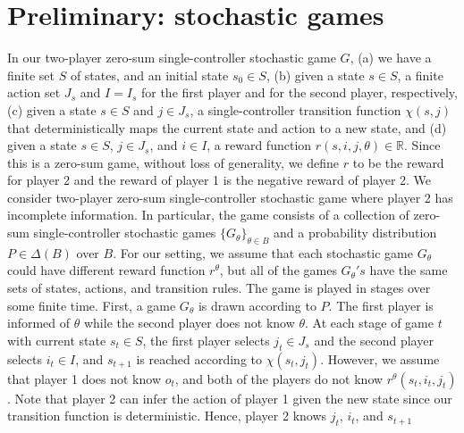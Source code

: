 \section{Preliminary: stochastic games} \label{stochastic_games}
In our two-player zero-sum single-controller stochastic game $G$, 
(a) we have a finite set $S$ of states, 
and an initial state $s_0 \in S$, 
(b) given a state $s \in S$, a finite action set $J_{s}$ and $I=I_s$ 
for the first player and for the second player, respectively, 
(c) given a state $s \in S$ and $j \in J_s$, a single-controller transition function
$\chi(s, j)$ that deterministically maps the current state and action to a new state, 
and (d) given a state $s \in S$, $j \in J_s$, and $i \in I$, 
a reward function $r(s,i,j,\theta) \in \mathbb{R}$. 
Since this is a zero-sum game, without loss of generality, 
we define $r$ to be the reward for player 2 and 
the reward of player 1 is the negative reward of player 2. 
We consider two-player zero-sum single-controller stochastic game 
where player 2 has incomplete information. 
In particular, the game consists of a collection of zero-sum 
single-controller stochastic games $\{G_\theta\}_{\theta \in B}$ 
and a probability distribution $P \in \Delta(B)$ over $B$. 
For our setting, we assume that each stochastic game 
$G_\theta$ could have different reward function $r^\theta$, but 
all of the games $G_\theta's$ have the same sets of states, actions, and transition rules. 
The game is played in stages over some finite time. 
First, a game $G_\theta$ is drawn according to $P$. 
The first player is informed of $\theta$
while the second player does not know $\theta$. 
At each stage of game $t$ with current state $s_t \in S$, 
the first player selects $j_t \in J_s$ 
and the second player selects $i_t \in I$, 
and $s_{t+1}$ is reached according to $\chi(s_t, j_t)$.
However, we assume that player 1 does not know $o_t$, 
and both of the players do not know $r^\theta(s_t, i_t, j_t)$. Note that 
player 2 can infer the action of player 1 given the new state 
since our transition function is deterministic. Hence,
player 2 knows $j_t$, $i_t$, and $s_{t+1}$

